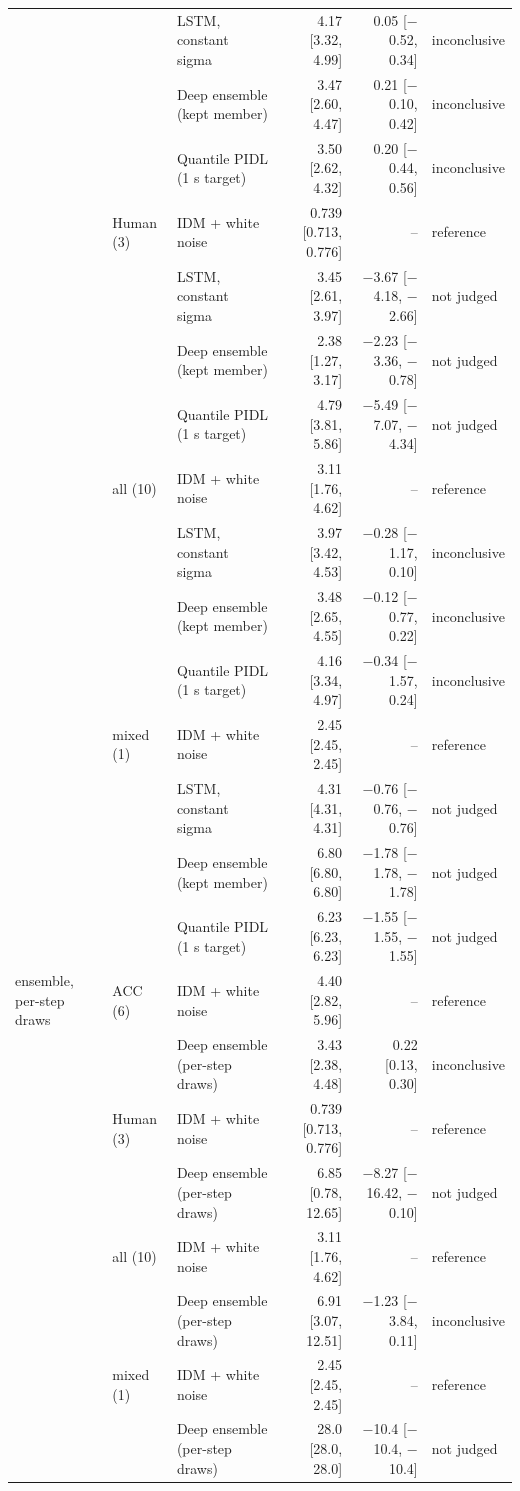 \begin{longtable}{lllrrl}
 &  & LSTM, constant sigma & 4.17 [3.32, 4.99] & 0.05 [$-$0.52, 0.34] & inconclusive \\
 &  & Deep ensemble (kept member) & 3.47 [2.60, 4.47] & 0.21 [$-$0.10, 0.42] & inconclusive \\
 &  & Quantile PIDL (1 s target) & 3.50 [2.62, 4.32] & 0.20 [$-$0.44, 0.56] & inconclusive \\
\midrule
 & Human (3) & IDM + white noise & 0.739 [0.713, 0.776] & -- & reference \\
 &  & LSTM, constant sigma & 3.45 [2.61, 3.97] & $-$3.67 [$-$4.18, $-$2.66] & not judged \\
 &  & Deep ensemble (kept member) & 2.38 [1.27, 3.17] & $-$2.23 [$-$3.36, $-$0.78] & not judged \\
 &  & Quantile PIDL (1 s target) & 4.79 [3.81, 5.86] & $-$5.49 [$-$7.07, $-$4.34] & not judged \\
\midrule
 & all (10) & IDM + white noise & 3.11 [1.76, 4.62] & -- & reference \\
 &  & LSTM, constant sigma & 3.97 [3.42, 4.53] & $-$0.28 [$-$1.17, 0.10] & inconclusive \\
 &  & Deep ensemble (kept member) & 3.48 [2.65, 4.55] & $-$0.12 [$-$0.77, 0.22] & inconclusive \\
 &  & Quantile PIDL (1 s target) & 4.16 [3.34, 4.97] & $-$0.34 [$-$1.57, 0.24] & inconclusive \\
\midrule
 & mixed (1) & IDM + white noise & 2.45 [2.45, 2.45] & -- & reference \\
 &  & LSTM, constant sigma & 4.31 [4.31, 4.31] & $-$0.76 [$-$0.76, $-$0.76] & not judged \\
 &  & Deep ensemble (kept member) & 6.80 [6.80, 6.80] & $-$1.78 [$-$1.78, $-$1.78] & not judged \\
 &  & Quantile PIDL (1 s target) & 6.23 [6.23, 6.23] & $-$1.55 [$-$1.55, $-$1.55] & not judged \\
\midrule
ensemble, per-step draws & ACC (6) & IDM + white noise & 4.40 [2.82, 5.96] & -- & reference \\
 &  & Deep ensemble (per-step draws) & 3.43 [2.38, 4.48] & 0.22 [0.13, 0.30] & inconclusive \\
\midrule
 & Human (3) & IDM + white noise & 0.739 [0.713, 0.776] & -- & reference \\
 &  & Deep ensemble (per-step draws) & 6.85 [0.78, 12.65] & $-$8.27 [$-$16.42, $-$0.10] & not judged \\
\midrule
 & all (10) & IDM + white noise & 3.11 [1.76, 4.62] & -- & reference \\
 &  & Deep ensemble (per-step draws) & 6.91 [3.07, 12.51] & $-$1.23 [$-$3.84, 0.11] & inconclusive \\
\midrule
 & mixed (1) & IDM + white noise & 2.45 [2.45, 2.45] & -- & reference \\
 &  & Deep ensemble (per-step draws) & 28.0 [28.0, 28.0] & $-$10.4 [$-$10.4, $-$10.4] & not judged \\
\end{longtable}
\endgroup
